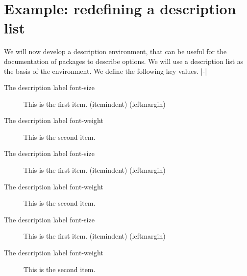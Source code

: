 \section{Example: redefining a description list}
We will now develop a description environment, that can be useful for the documentation of packages to describe options. We will use a description list as the basis of the environment. We define the following key values.
|\itemindent-\leftmargin|

\begin{description}
\item[The description label font-size] This is the first item. \the\itemindent (itemindent) \the\leftmargin (leftmargin)
\item[The description label font-weight] This is the second item. \lipsum*[1]
\end{description}

         
\begin{description}
\item[The description label font-size] This is the first item. \the\itemindent (itemindent) \the\leftmargin (leftmargin)
\item[The description label font-weight] This is the second item. \lipsum*[1]
\end{description}

         
\begin{description}
\item[The description label font-size] This is the first item. \the\itemindent (itemindent) \the\leftmargin (leftmargin)
\item[The description label font-weight] This is the second item. \lipsum[1]
\end{description}
\endinput

\section{Enumerated lists}


\begin{enumerate}
\item one
\item two
\item three
\end{enumerate}

